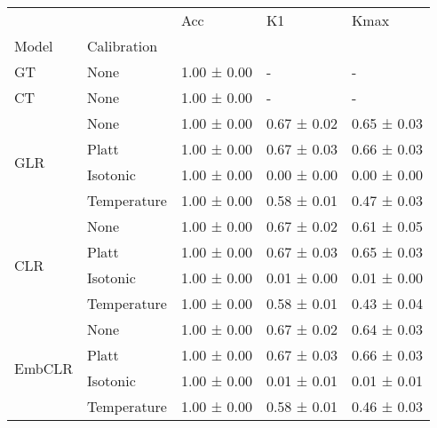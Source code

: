 \begin{tabular}{lllll}
\toprule
 &  & Acc & K1 & Kmax \\
Model & Calibration &  &  &  \\
\midrule
GT & None & 1.00 ± 0.00 & - & - \\
\cline{1-5}
CT & None & 1.00 ± 0.00 & - & - \\
\cline{1-5}
\multirow[t]{4}{*}{GLR} & None & 1.00 ± 0.00 & 0.67 ± 0.02 & 0.65 ± 0.03 \\
 & Platt & 1.00 ± 0.00 & 0.67 ± 0.03 & 0.66 ± 0.03 \\
 & Isotonic & 1.00 ± 0.00 & 0.00 ± 0.00 & 0.00 ± 0.00 \\
 & Temperature & 1.00 ± 0.00 & 0.58 ± 0.01 & 0.47 ± 0.03 \\
\cline{1-5}
\multirow[t]{4}{*}{CLR} & None & 1.00 ± 0.00 & 0.67 ± 0.02 & 0.61 ± 0.05 \\
 & Platt & 1.00 ± 0.00 & 0.67 ± 0.03 & 0.65 ± 0.03 \\
 & Isotonic & 1.00 ± 0.00 & 0.01 ± 0.00 & 0.01 ± 0.00 \\
 & Temperature & 1.00 ± 0.00 & 0.58 ± 0.01 & 0.43 ± 0.04 \\
\cline{1-5}
\multirow[t]{4}{*}{EmbCLR} & None & 1.00 ± 0.00 & 0.67 ± 0.02 & 0.64 ± 0.03 \\
 & Platt & 1.00 ± 0.00 & 0.67 ± 0.03 & 0.66 ± 0.03 \\
 & Isotonic & 1.00 ± 0.00 & 0.01 ± 0.01 & 0.01 ± 0.01 \\
 & Temperature & 1.00 ± 0.00 & 0.58 ± 0.01 & 0.46 ± 0.03 \\
\cline{1-5}
\bottomrule
\end{tabular}
